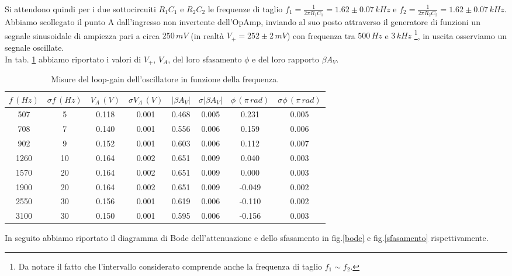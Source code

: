 \documentclass[10pt,a4paper]{article}
\begin{document}
Si attendono quindi per i due sottocircuiti $R_1 C_1$ e $R_2 C_2$ le frequenze di taglio $f_1=\frac{1}{2 \pi R_1C_1} = 1.62 \pm 0.07 \, kHz $ e $f_2=\frac{1}{2 \pi R_2C_2} = 1.62 \pm 0.07 \, kHz$.\\

Abbiamo scollegato il punto A dall'ingresso non invertente dell'OpAmp, inviando al suo posto attraverso il generatore di funzioni un segnale sinusoidale di ampiezza pari a circa $250\,mV$ (in realtà $V_{+} = 252 \pm 2 \, mV$) con frequenza tra $500\,Hz$ e $3\,kHz$ \footnote{Da notare il fatto che l'intervallo considerato comprende anche la frequenza di taglio $f_1 \sim f_2$.}, in uscita osserviamo un segnale oscillate.\\
In tab. \ref{tabella} abbiamo riportato i valori di $V_+$, $V_A$, del loro sfasamento $\phi$ e del loro rapporto $\beta A_V$.\\

\begin{table}[!htb]
\centering
\begin{tabular}{|c|c|c|c|c|c|c|c|}
\hline
$f\,(Hz)$ & $ \sigma f \, (Hz)$ & $V_A \, (V)$ & $\sigma V_A \, (V)$ & $\vert \beta A_V \vert$ & $\sigma \vert \beta A_V \vert$ & $ \phi \, ( \pi \, rad)$ & $ \sigma \phi \, ( \pi \, rad)$\\
\hline
507 & 5 & 0.118 & 0.001 & 0.468 & 0.005 & 0.231 & 0.005\\
708 & 7 & 0.140 & 0.001 & 0.556 & 0.006 & 0.159 & 0.006\\
902 & 9 & 0.152 & 0.001 & 0.603 & 0.006 & 0.112 & 0.007\\
1260 & 10 & 0.164 & 0.002 & 0.651 & 0.009 & 0.040 & 0.003\\
1570 & 20 & 0.164 & 0.002 & 0.651 & 0.009 & 0.000 & 0.003\\
1900 & 20 & 0.164 & 0.002 & 0.651 & 0.009 & -0.049 & 0.002\\
2550 & 30 & 0.156 & 0.001 & 0.619 & 0.006 & -0.110 & 0.002\\
3100 & 30 & 0.150 & 0.001 & 0.595 & 0.006 & -0.156 & 0.003\\
\hline
\end{tabular}
\label{tabella}
\caption{Misure del loop-gain dell'oscillatore in funzione della frequenza.}
\end{table}

In seguito abbiamo riportato il diagramma di Bode dell'attenuazione e dello sfasamento in fig.\ref{bode} e fig.\ref{sfasamento} rispettivamente.\\
\end{document}

